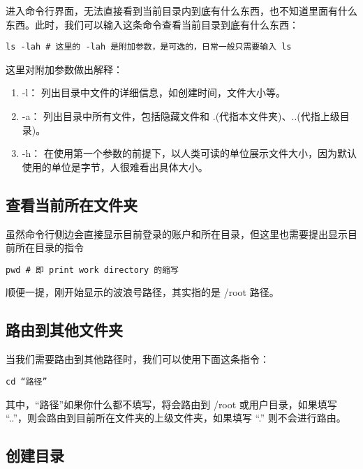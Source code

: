 \documentclass[UTF8]{gyh}
\begin{document}
进入命令行界面，无法直接看到当前目录内到底有什么东西，也不知道里面有什么东西。此时，我们可以输入这条命令查看当前目录到底有什么东西：

\begin{lstlisting}
ls -lah # 这里的 -lah 是附加参数，是可选的，日常一般只需要输入 ls
\end{lstlisting}

这里对附加参数做出解释：

\begin{enumerate}
\item -l： 列出目录中文件的详细信息，如创建时间，文件大小等。


\item -a： 列出目录中所有文件，包括隐藏文件和 .(代指本文件夹)、..(代指上级目录)。


\item -h： 在使用第一个参数的前提下，以人类可读的单位展示文件大小，因为默认使用的单位是字节，人很难看出具体大小。


\end{enumerate}

\subsection{查看当前所在文件夹}

虽然命令行侧边会直接显示目前登录的账户和所在目录，但这里也需要提出显示目前所在目录的指令

\begin{lstlisting}
pwd # 即 print work directory 的缩写
\end{lstlisting}

顺便一提，刚开始显示的波浪号路径，其实指的是 /root 路径。

\subsection{路由到其他文件夹}

当我们需要路由到其他路径时，我们可以使用下面这条指令：

\begin{lstlisting}
cd “路径”
\end{lstlisting}

其中，“路径”如果你什么都不填写，将会路由到 /root 或用户目录，如果填写 “..”，则会路由到目前所在文件夹的上级文件夹，如果填写 “.” 则不会进行路由。

\subsection{创建目录}
\end{document}
